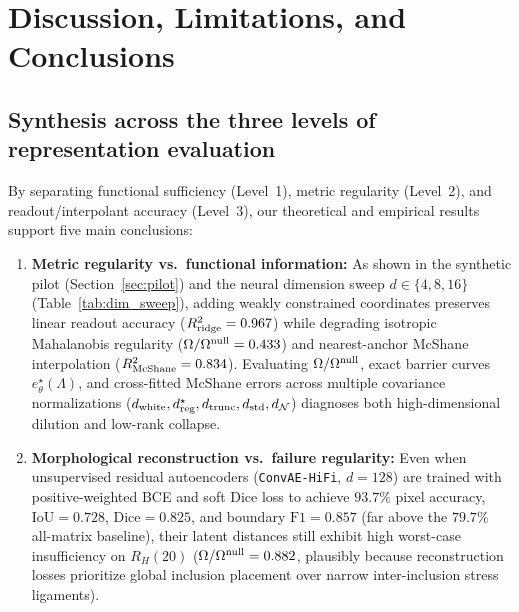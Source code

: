 \documentclass[preprint,11pt,a4paper]{elsarticle}
\begin{document}
\section{Discussion, Limitations, and Conclusions}
\label{sec:discussion}

\subsection{Synthesis across the three levels of representation evaluation}

By separating functional sufficiency (Level~1), metric regularity (Level~2), and readout/interpolant accuracy (Level~3), our theoretical and empirical results support five main conclusions:
\begin{enumerate}
    \item \textbf{Metric regularity vs.\ functional information:} As shown in the synthetic pilot (Section~\ref{sec:pilot}) and the neural dimension sweep $d\in\{4,8,16\}$ (Table~\ref{tab:dim_sweep}), adding weakly constrained coordinates preserves linear readout accuracy ($R^2_{\rm ridge}=0.967$) while degrading isotropic Mahalanobis regularity ($\Omega/\Omega^{\rm null}=0.433$) and nearest-anchor McShane interpolation ($R^2_{\rm McShane}=0.834$). Evaluating $\Omega/\Omega^{\rm null}$, exact barrier curves $e^\star_\theta(\Lambda)$, and cross-fitted McShane errors across multiple covariance normalizations ($d_{\rm white}, d_{\rm reg}^\star, d_{\rm trunc}, d_{\rm std}, d_{\mathcal N}$) diagnoses both high-dimensional dilution and low-rank collapse.
    \item \textbf{Morphological reconstruction vs.\ failure regularity:} Even when unsupervised residual autoencoders (\texttt{ConvAE-HiFi}, $d=128$) are trained with positive-weighted BCE and soft Dice loss to achieve $93.7\%$ pixel accuracy, $\text{IoU}=0.728$, $\text{Dice}=0.825$, and boundary $\text{F1}=0.857$ (far above the $79.7\%$ all-matrix baseline), their latent distances still exhibit high worst-case insufficiency on $R_H(20)$ ($\Omega/\Omega^{\rm null}=0.882$, plausibly because reconstruction losses prioritize global inclusion placement over narrow inter-inclusion stress ligaments).

\end{enumerate}
\end{document}
